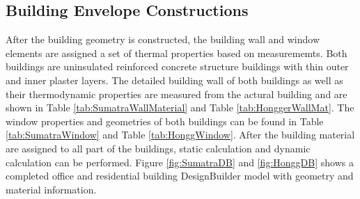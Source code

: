\documentclass[a4paper, oneside]{discothesis}
\begin{document}
		\subsection{Building Envelope Constructions}
			After the building geometry is constructed, the building wall and window elements are assigned a set of thermal properties based on measurememts.
			Both buildings are uninsulated reinforced concrete structure buildings with thin outer and inner plaster layers. The detailed building wall of both buildings as well as their thermodynamic properties are measured from the actural building and are shown in Table \ref{tab:SumatraWallMaterial} and Table \ref{tab:HonggerWallMat}. The window properties and geometries of both buildings can be found in Table \ref{tab:SumatraWindow} and Table \ref{tab:HonggWindow}. After the building material are assigned to all part of the buildings, static calculation and dynamic calculation can be performed. Figure \ref{fig:SumatraDB} and \ref{fig:HonggDB} shows a completed office and residential building DesignBuilder model with geometry and material information.\\
			
\end{document}
